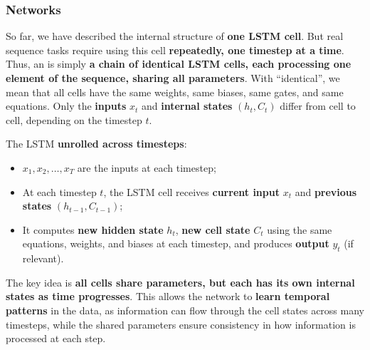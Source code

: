 \subsubsection{Networks}

So far, we have described the internal structure of \textbf{one LSTM cell}. But real sequence tasks require using this cell \textbf{repeatedly, one timestep at a time}. Thus, an  is simply \textbf{a chain of identical LSTM cells, each processing one element of the sequence, sharing all parameters}. With ``identical'', we mean that all cells have the same weights, same biases, same gates, and same equations. Only the \textbf{inputs} $x_t$ and \textbf{internal states} $\left(h_t, C_t\right)$ differ from cell to cell, depending on the timestep $t$.

\highspace
The LSTM \textbf{unrolled across timesteps}:
\begin{itemize}
    \item $x_1, x_2, \ldots, x_T$ are the inputs at each timestep;
    \item At each timestep $t$, the LSTM cell receives \textbf{current input} $x_t$ and \textbf{previous states} $\left(h_{t-1}, C_{t-1}\right)$;
    \item It computes \textbf{new hidden state} $h_t$, \textbf{new cell state} $C_t$ using the same equations, weights, and biases at each timestep, and produces \textbf{output} $y_t$ (if relevant).
\end{itemize}
The key idea is \textbf{all cells share parameters, but each has its own internal states as time progresses}. This allows the network to \textbf{learn temporal patterns} in the data, as information can flow through the cell states across many timesteps, while the shared parameters ensure consistency in how information is processed at each step.

